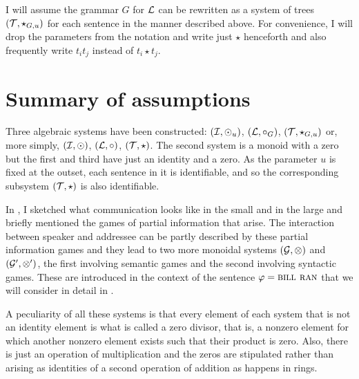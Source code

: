 I will assume the grammar $G$ for $\cal L$ can be rewritten as a system of trees $({\cal T},\star_{G,u})$ for each sentence in the manner described above. For convenience, I will drop the parameters from the notation and write just $\star$ henceforth and also frequently write $t_it_j$ instead of $t_i \star t_j$.


\section{Summary of assumptions}\label{sec:4.3}

Three algebraic systems have been constructed: $({\cal I}, \odot_{u})$, $({\cal L}, \circ_G)$, $({\cal T}, \star_{G,u})$ or, more simply, $({\cal I}, \odot)$, $({\cal L}, \circ)$, $({\cal T}, \star)$. The second system is a monoid with a zero but the  first and third have just an identity and a zero. As the parameter $u$ is fixed at the outset, each sentence in it is identifiable, and so the corresponding subsystem $({\cal T}, \star)$ is also identifiable.

In , I sketched what communication looks like in the small and in the large and briefly mentioned the games of partial information that arise. The interaction between speaker and addressee can be partly described by these partial information games and they lead to two more monoidal systems $({\cal G}, \otimes)$ and $({\cal G}', \otimes')$, the first involving semantic games and the second involving syntactic games. These are introduced in the context of the sentence $\varphi = \Expression{Bill ran}$ that we will consider in detail in .

A peculiarity of all these systems is that every element of each system that is not an identity element is what is called a zero divisor, that is, a nonzero element for which another nonzero element exists such that their product is zero. Also, there is just an operation of multiplication and the zeros are stipulated rather than arising as identities of a second operation of addition as happens in rings.
